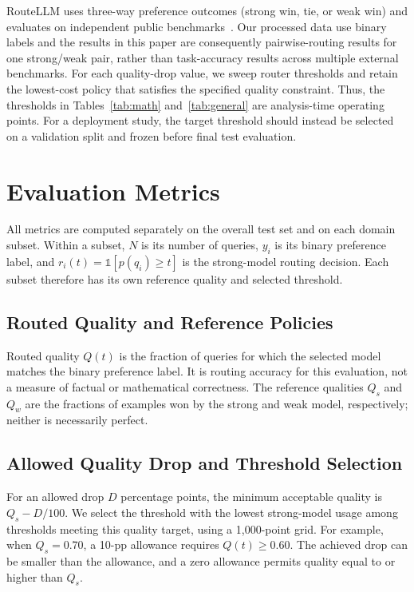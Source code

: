 \documentclass[conference]{IEEEtran}
\begin{document}
RouteLLM uses three-way preference outcomes (strong win, tie, or weak win) and evaluates on independent public benchmarks~\cite{ong2024routellm}. Our processed data use binary labels and the results in this paper are consequently pairwise-routing results for one strong/weak pair, rather than task-accuracy results across multiple external benchmarks. For each quality-drop value, we sweep router thresholds and retain the lowest-cost policy that satisfies the specified quality constraint. Thus, the thresholds in Tables~\ref{tab:math} and~\ref{tab:general} are analysis-time operating points. For a deployment study, the target threshold should instead be selected on a validation split and frozen before final test evaluation.

\section{Evaluation Metrics}
\label{sec:metrics}
All metrics are computed separately on the overall test set and on each domain subset. Within a subset, $N$ is its number of queries, $y_i$ is its binary preference label, and $r_i(t)=\mathbb{1}[p(q_i)\geq t]$ is the strong-model routing decision. Each subset therefore has its own reference quality and selected threshold.

\subsection{Routed Quality and Reference Policies}
Routed quality $Q(t)$ is the fraction of queries for which the selected model matches the binary preference label. It is routing accuracy for this evaluation, not a measure of factual or mathematical correctness. The reference qualities $Q_s$ and $Q_w$ are the fractions of examples won by the strong and weak model, respectively; neither is necessarily perfect.

\subsection{Allowed Quality Drop and Threshold Selection}
For an allowed drop $D$ percentage points, the minimum acceptable quality is $Q_s-D/100$. We select the threshold with the lowest strong-model usage among thresholds meeting this quality target, using a 1,000-point grid. For example, when $Q_s=0.70$, a 10-pp allowance requires $Q(t)\geq0.60$. The achieved drop can be smaller than the allowance, and a zero allowance permits quality equal to or higher than $Q_s$.
\end{document}
